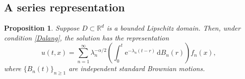 \documentclass[reqno]{amsart}
\DeclareMathOperator{\Var}{Var}
\newcommand{\R}{\mathbb R}
\renewcommand{\d}{\mathrm d}
\newcommand{\e}{\mathrm e}
\newcommand{\1}{\mathbf 1}
\numberwithin{equation}{section}
\newtheorem{proposition}[theorem]{Proposition}
\theoremstyle{definition}
\begin{document}
%

\subsection{A series representation}

\begin{proposition}\label{prop:spec:rep}
Suppose $D \subset \R^d$ is a bounded Lipschitz domain. 
Then, under condition \eqref{Dalang}, the solution has the representation
\begin{equation}\label{eq:spectral}
    u(t,x)=
    \sum_{n=1}^\infty
    \lambda_n^{-\alpha/2}
    \left(\int_0^t \e^{-\lambda_n(t-r)}\,\d B_n(r)\right)f_n(x),
\end{equation}
where \(\{B_n(t)\}_{n\ge1}\) are independent standard Brownian motions.
\end{proposition}
\end{document}

